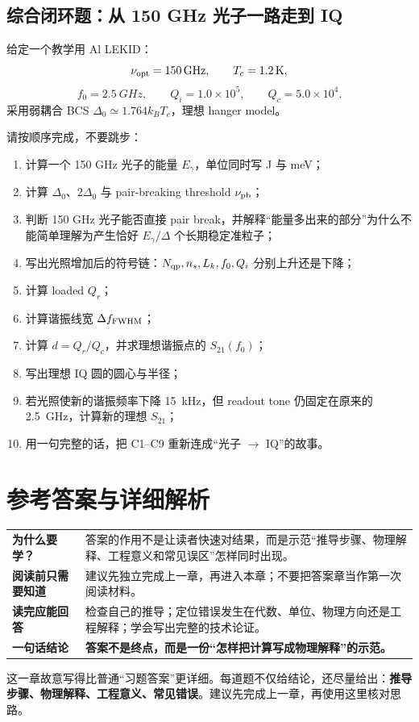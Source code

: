 \documentclass[11pt,a4paper,openany]{ctexrep}
\newcommand{\chapterguide}[4]{%
\begin{tcolorbox}[
  enhanced,
  breakable,
  colback=KidGray!45,
  colframe=KidBlue!65,
  boxrule=0.8pt,
  arc=2mm,
  title=本章导航,
  fonttitle=\bfseries,
  before skip=0.7em,
  after skip=1.0em]
\renewcommand{\arraystretch}{1.18}
\noindent\begin{tabularx}{\textwidth}{>{\bfseries\color{KidBlue}}p{3.0cm} X}
为什么要学？ & #1 \\
阅读前只需要知道 & #2 \\
读完应能回答 & #3 \\
一句话结论 & \textbf{#4} \\
\end{tabularx}
\end{tcolorbox}%
}
\begin{document}
\section{综合闭环题：从 150 GHz 光子一路走到 IQ}

\begin{projectbox}
给定一个教学用 Al LEKID：
\[
\nu_{\rm opt}=\SI{150}{GHz},\qquad T_c=\SI{1.2}{K},
\]
\[
f_0=\SI{2.5}{GHz},\qquad Q_i=1.0\times10^5,\qquad Q_c=5.0\times10^4.
\]
采用弱耦合 BCS $\Delta_0\simeq1.764k_BT_c$，理想 hanger model。
\end{projectbox}

请按顺序完成，不要跳步：
\begin{enumerate}[label=\textbf{C\arabic*.}]
  \item 计算一个 150 GHz 光子的能量 $E_\gamma$，单位同时写 J 与 meV；
  \item 计算 $\Delta_0$、$2\Delta_0$ 与 pair-breaking threshold $\nu_{\rm pb}$；
  \item 判断 150 GHz 光子能否直接 pair break，并解释“能量多出来的部分”为什么不能简单理解为产生恰好 $E_\gamma/\Delta$ 个长期稳定准粒子；
  \item 写出光照增加后的符号链：$N_{\rm qp},n_s,L_k,f_0,Q_i$ 分别上升还是下降；
  \item 计算 loaded $Q_r$；
  \item 计算谐振线宽 $\Delta f_{\rm FWHM}$；
  \item 计算 $d=Q_r/Q_c$，并求理想谐振点的 $S_{21}(f_0)$；
  \item 写出理想 IQ 圆的圆心与半径；
  \item 若光照使新的谐振频率下降 \SI{15}{kHz}，但 readout tone 仍固定在原来的 \SI{2.5}{GHz}，计算新的理想 $S_{21}$；
  \item 用一句完整的话，把 C1--C9 重新连成“光子 $\rightarrow$ IQ”的故事。
\end{enumerate}

\clearpage
\chapter{参考答案与详细解析}
\chapterguide
{答案的作用不是让读者快速对结果，而是示范“推导步骤、物理解释、工程意义和常见误区”怎样同时出现。}
{建议先独立完成上一章，再进入本章；不要把答案章当作第一次阅读材料。}
{检查自己的推导；定位错误发生在代数、单位、物理方向还是工程解释；学会写出完整的技术论证。}
{答案不是终点，而是一份“怎样把计算写成物理解释”的示范。}

\begin{goalbox}
这一章故意写得比普通“习题答案”更详细。每道题不仅给结论，还尽量给出：\textbf{推导步骤、物理解释、工程意义、常见错误}。建议先完成上一章，再使用这里核对思路。
\end{goalbox}
\end{document}
